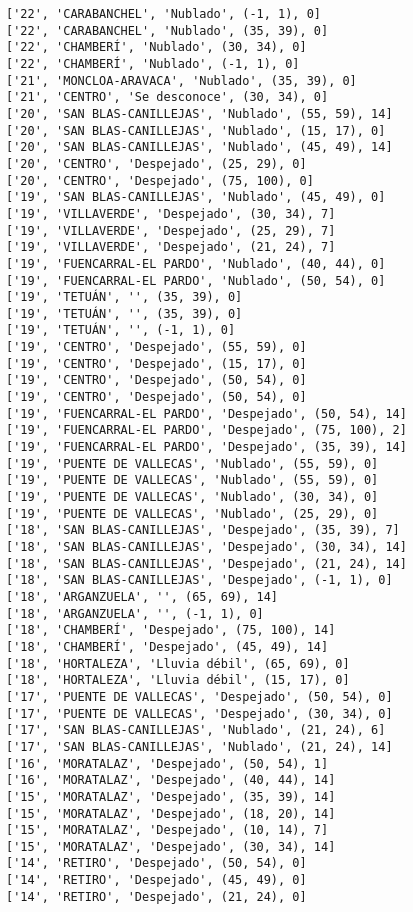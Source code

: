 \documentclass[11pt]{article}
\begin{document}
\begin{Verbatim}[commandchars=\\\{\}]
['22', 'CARABANCHEL', 'Nublado', (-1, 1), 0]
['22', 'CARABANCHEL', 'Nublado', (35, 39), 0]
['22', 'CHAMBERÍ', 'Nublado', (30, 34), 0]
['22', 'CHAMBERÍ', 'Nublado', (-1, 1), 0]
['21', 'MONCLOA-ARAVACA', 'Nublado', (35, 39), 0]
['21', 'CENTRO', 'Se desconoce', (30, 34), 0]
['20', 'SAN BLAS-CANILLEJAS', 'Nublado', (55, 59), 14]
['20', 'SAN BLAS-CANILLEJAS', 'Nublado', (15, 17), 0]
['20', 'SAN BLAS-CANILLEJAS', 'Nublado', (45, 49), 14]
['20', 'CENTRO', 'Despejado', (25, 29), 0]
['20', 'CENTRO', 'Despejado', (75, 100), 0]
['19', 'SAN BLAS-CANILLEJAS', 'Nublado', (45, 49), 0]
['19', 'VILLAVERDE', 'Despejado', (30, 34), 7]
['19', 'VILLAVERDE', 'Despejado', (25, 29), 7]
['19', 'VILLAVERDE', 'Despejado', (21, 24), 7]
['19', 'FUENCARRAL-EL PARDO', 'Nublado', (40, 44), 0]
['19', 'FUENCARRAL-EL PARDO', 'Nublado', (50, 54), 0]
['19', 'TETUÁN', '', (35, 39), 0]
['19', 'TETUÁN', '', (35, 39), 0]
['19', 'TETUÁN', '', (-1, 1), 0]
['19', 'CENTRO', 'Despejado', (55, 59), 0]
['19', 'CENTRO', 'Despejado', (15, 17), 0]
['19', 'CENTRO', 'Despejado', (50, 54), 0]
['19', 'CENTRO', 'Despejado', (50, 54), 0]
['19', 'FUENCARRAL-EL PARDO', 'Despejado', (50, 54), 14]
['19', 'FUENCARRAL-EL PARDO', 'Despejado', (75, 100), 2]
['19', 'FUENCARRAL-EL PARDO', 'Despejado', (35, 39), 14]
['19', 'PUENTE DE VALLECAS', 'Nublado', (55, 59), 0]
['19', 'PUENTE DE VALLECAS', 'Nublado', (55, 59), 0]
['19', 'PUENTE DE VALLECAS', 'Nublado', (30, 34), 0]
['19', 'PUENTE DE VALLECAS', 'Nublado', (25, 29), 0]
['18', 'SAN BLAS-CANILLEJAS', 'Despejado', (35, 39), 7]
['18', 'SAN BLAS-CANILLEJAS', 'Despejado', (30, 34), 14]
['18', 'SAN BLAS-CANILLEJAS', 'Despejado', (21, 24), 14]
['18', 'SAN BLAS-CANILLEJAS', 'Despejado', (-1, 1), 0]
['18', 'ARGANZUELA', '', (65, 69), 14]
['18', 'ARGANZUELA', '', (-1, 1), 0]
['18', 'CHAMBERÍ', 'Despejado', (75, 100), 14]
['18', 'CHAMBERÍ', 'Despejado', (45, 49), 14]
['18', 'HORTALEZA', 'Lluvia débil', (65, 69), 0]
['18', 'HORTALEZA', 'Lluvia débil', (15, 17), 0]
['17', 'PUENTE DE VALLECAS', 'Despejado', (50, 54), 0]
['17', 'PUENTE DE VALLECAS', 'Despejado', (30, 34), 0]
['17', 'SAN BLAS-CANILLEJAS', 'Nublado', (21, 24), 6]
['17', 'SAN BLAS-CANILLEJAS', 'Nublado', (21, 24), 14]
['16', 'MORATALAZ', 'Despejado', (50, 54), 1]
['16', 'MORATALAZ', 'Despejado', (40, 44), 14]
['15', 'MORATALAZ', 'Despejado', (35, 39), 14]
['15', 'MORATALAZ', 'Despejado', (18, 20), 14]
['15', 'MORATALAZ', 'Despejado', (10, 14), 7]
['15', 'MORATALAZ', 'Despejado', (30, 34), 14]
['14', 'RETIRO', 'Despejado', (50, 54), 0]
['14', 'RETIRO', 'Despejado', (45, 49), 0]
['14', 'RETIRO', 'Despejado', (21, 24), 0]

\end{Verbatim}
\end{document}
